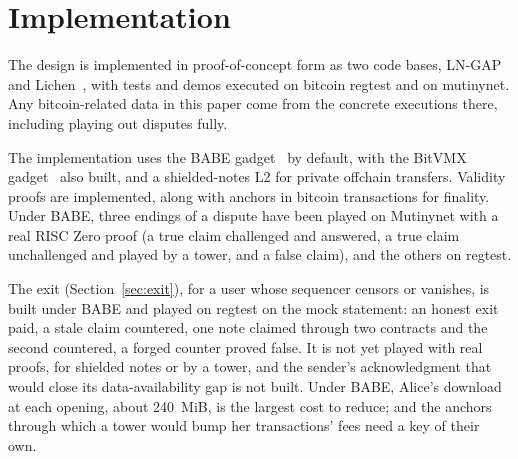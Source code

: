 \documentclass[11pt]{article}
\begin{document}
\section{Implementation}
\label{sec:status}

The design is implemented in proof-of-concept form as two code bases, LN-GAP~\cite{lngapcode} and Lichen~\cite{lichencode}, with tests and demos executed on bitcoin regtest and on mutinynet. Any bitcoin-related data in this paper come from the concrete executions there, including playing out disputes fully.

The implementation uses the BABE gadget~\cite{lichenbabe} by default, with the BitVMX gadget~\cite{lichenbitvmx} also built, and a shielded-notes L2 for private offchain transfers. Validity proofs are implemented, along with anchors in bitcoin transactions for finality. Under BABE, three endings of a dispute have been played on Mutinynet with a real RISC Zero proof (a true claim challenged and answered, a true claim unchallenged and played by a tower, and a false claim), and the others on regtest.

The exit (Section~\ref{sec:exit}), for a user whose sequencer censors or vanishes, is built under BABE and played on regtest on the mock statement: an honest exit paid, a stale claim countered, one note claimed through two contracts and the second countered, a forged counter proved false. It is not yet played with real proofs, for shielded notes or by a tower, and the sender's acknowledgment that would close its data-availability gap is not built. Under BABE, Alice's download at each opening, about 240~MiB, is the largest cost to reduce; and the anchors through which a tower would bump her transactions' fees need a key of their own.
\end{document}
